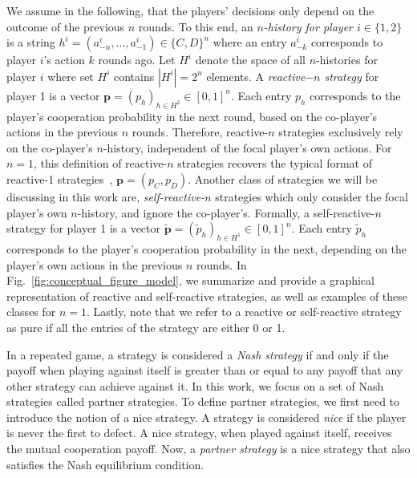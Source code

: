 \documentclass{article}
\theoremstyle{definition}
\begin{document}
We assume in the following, that the players' decisions only depend on the
outcome of the previous $n$ rounds. To this end, an {\it $n$-history for player
$i \in \{1, 2\}$} is a string $h^i=(a^i_{-n},\ldots,a^i_{-1})\!\in\!\{C,D\}^n$
where an entry $a^i_{-k}$ corresponds to player $i$'s action $k$ rounds ago. Let
$H^i$ denote the space of all $n$-histories for player $i$ where set $H^i$
contains $|H^i|=2^{n}$ elements. A {\it reactive$-n$ strategy} for player 1 is a
vector $\mathbf{p}=(p_h)_{h\in H^2} \in [0, 1]^{n}$. Each entry $p_h$
corresponds to the player's cooperation probability in the next round, based on
the co-player's actions in the previous $n$ rounds. Therefore, reactive-$n$
strategies exclusively rely on the co-player's $n$-history, independent of the
focal player's own actions. For \(n=1\), this definition of reactive-\(n\)
strategies recovers the typical format of reactive-1
strategies~\cite{baek:scientific:2016, wahl:JTB:1999, mcavoy:PRSA:2019},
\(\mathbf{p}=(p_C, p_D)\). Another class of strategies we will be discussing in
this work are, {\it self-reactive-$n$} strategies which only consider the focal
player's own $n$-history, and ignore the co-player's. Formally, a
self-reactive-$n$ strategy for player 1 is a vector $\mathbf{\tilde{p}} =
(\tilde{p}_h)_{h \in H^1} \in [0, 1] ^ {n}$. Each entry $\tilde{p}_h$
corresponds to the player's cooperation probability in the next, depending on
the player's own actions in the previous $n$ rounds.
In Fig.~\ref{fig:conceptual_figure_model}, we summarize and provide a graphical
representation of reactive and self-reactive strategies, as well as examples of
these classes for $n=1$. Lastly, note that we refer to a reactive or
self-reactive strategy as pure if all the entries of the strategy are either 0
or 1.

In a repeated game, a strategy is considered a {\it Nash strategy} if and only if the
payoff when playing against itself is greater than or equal to any payoff that
any other strategy can achieve against it. In this work, we focus on a set of
Nash strategies called partner strategies. To define partner strategies, we
first need to introduce the notion of a nice strategy. A strategy is considered
{\it nice} if the player is never the first to defect. A nice strategy, when played
against itself, receives the mutual cooperation payoff. Now, a {\it partner strategy}
is a nice strategy that also satisfies the Nash equilibrium condition.
\end{document}

